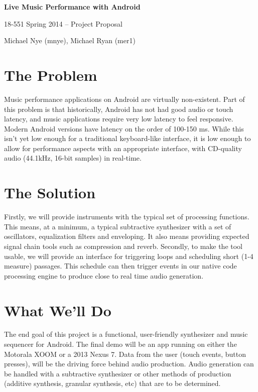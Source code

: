 \documentclass[letterpaper,12pt]{article}
\begin{document}
\begin{center}
    \par{\bf \LARGE Live Music Performance with Android}
    \par{\large 18-551 Spring 2014 -- Project Proposal}
    \par{\large Michael Nye (mnye), Michael Ryan (mer1)}
\end{center}


\section*{The Problem}

Music performance applications on Android are virtually non-existent. Part of
this problem is that historically, Android has not had good audio or touch
latency, and music applications require very low latency to feel responsive.
Modern Android versions have latency on the order of 100-150 ms. While this
isn't yet low enough for a traditional keyboard-like interface, it is low enough
to allow for performance aspects with an appropriate interface, with CD-quality
audio (44.1kHz, 16-bit samples) in real-time.


\section*{The Solution}

Firstly, we will provide instruments with the typical set of processing
functions. This means, at a minimum, a typical subtractive synthesizer with
a set of oscillators, equalization filters and enveloping. It also means
providing expected signal chain tools such as compression and reverb. Secondly,
to make the tool usable, we will provide an interface for triggering loops and
scheduling short (1-4 measure) passages. This schedule can then trigger events
in our native code processing engine to produce close to real time audio
generation.


\section*{What We'll Do}

The end goal of this project is a functional, user-friendly synthesizer and
music sequencer for Android. The final demo will be an app running on either the
Motorala XOOM or a 2013 Nexus 7. Data from the user (touch events, button
presses), will be the driving force behind audio production. Audio generation
can be handled with a subtractive synthesizer or other methods of production
(additive synthesis, granular synthesis, etc) that are to be determined. 
\end{document}
